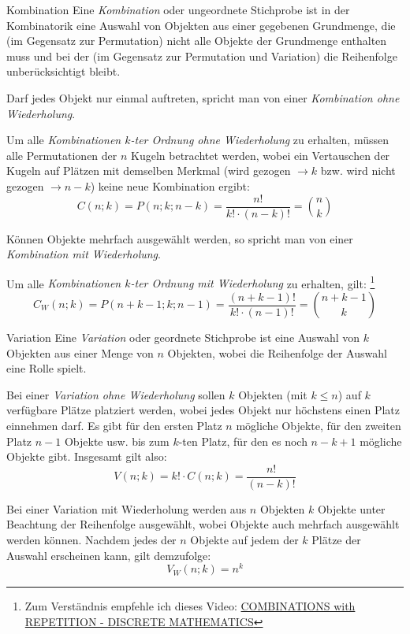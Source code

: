 \begin{defi}{Kombination}
    Eine \emph{Kombination} oder ungeordnete Stichprobe ist in der Kombinatorik eine Auswahl von Objekten aus einer gegebenen Grundmenge, die (im Gegensatz zur Permutation) nicht alle Objekte der Grundmenge enthalten muss und bei der (im Gegensatz zur Permutation und Variation) die Reihenfolge unberücksichtigt bleibt.

    Darf jedes Objekt nur einmal auftreten, spricht man von einer \emph{Kombination ohne Wiederholung}.

    Um alle \emph{Kombinationen $k$-ter Ordnung ohne Wiederholung} zu erhalten, müssen alle Permutationen der $n$ Kugeln betrachtet werden, wobei ein Vertauschen der Kugeln auf Plätzen mit demselben Merkmal (wird gezogen $\to k$ bzw. wird nicht gezogen $\to n-k$) keine neue Kombination ergibt:
    \[
        C(n;k) = P(n;k;n-k) = \frac{n!}{k! \cdot (n-k)!} = \binom{n}{k}
    \]

    Können Objekte mehrfach ausgewählt werden, so spricht man von einer \emph{Kombination mit Wiederholung}.

    Um alle \emph{Kombinationen $k$-ter Ordnung mit Wiederholung} zu erhalten, gilt:
    \footnote{Zum Verständnis empfehle ich dieses Video: \href{https://youtu.be/ZcSSI6VY1kM}{COMBINATIONS with REPETITION - DISCRETE MATHEMATICS}}
    \[
        C_W(n;k) = P(n+k-1;k;n-1) = \frac{(n+k-1)!}{k! \cdot (n-1)!} = \binom{n+k-1}{k}
    \]
\end{defi}

\begin{defi}{Variation}
    Eine \emph{Variation} oder geordnete Stichprobe ist eine Auswahl von $k$ Objekten aus einer Menge von $n$ Objekten, wobei die Reihenfolge der Auswahl eine Rolle spielt.

    Bei einer \emph{Variation ohne Wiederholung} sollen $k$ Objekten (mit $k \leq n$) auf $k$ verfügbare Plätze platziert werden, wobei jedes Objekt nur höchstens einen Platz einnehmen darf.
    Es gibt für den ersten Platz $n$ mögliche Objekte, für den zweiten Platz $n - 1$ Objekte usw. bis zum $k$-ten Platz, für den es noch $n - k + 1$ mögliche Objekte gibt.
    Insgesamt gilt also:
    \[
        V(n;k) = k! \cdot C(n;k) = \frac{n!}{(n-k)!}
    \]

    Bei einer Variation mit Wiederholung werden aus $n$ Objekten $k$ Objekte unter Beachtung der Reihenfolge ausgewählt, wobei Objekte auch mehrfach ausgewählt werden können.
    Nachdem jedes der $n$ Objekte auf jedem der $k$ Plätze der Auswahl erscheinen kann, gilt demzufolge:
    \[
        V_W(n;k) = n^k
    \]
\end{defi}

